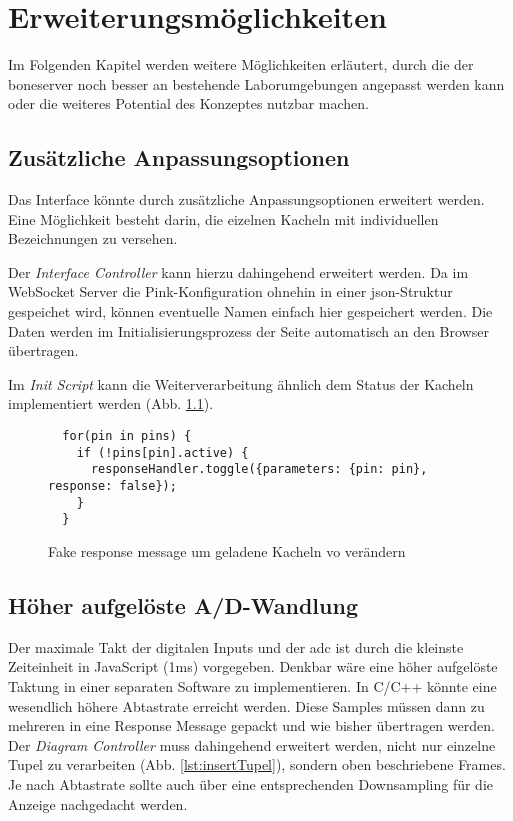 \chapter{Erweiterungsmöglichkeiten}
Im Folgenden Kapitel werden weitere Möglichkeiten erläutert, durch die der boneserver noch besser an bestehende Laborumgebungen angepasst werden kann oder die weiteres Potential des Konzeptes nutzbar machen.

\section{Zusätzliche Anpassungsoptionen}
Das Interface könnte durch zusätzliche Anpassungsoptionen erweitert werden. Eine Möglichkeit besteht darin, die eizelnen Kacheln mit individuellen Bezeichnungen zu versehen.

Der \textit{Interface Controller} kann hierzu dahingehend erweitert werden. Da im WebSocket Server die Pink-Konfiguration ohnehin in einer \gls{json}-Struktur gespeichet wird, können eventuelle Namen einfach hier gespeichert werden. Die Daten werden im Initialisierungsprozess der Seite automatisch an den Browser übertragen.

Im \textit{Init Script} kann die Weiterverarbeitung ähnlich dem Status der Kacheln implementiert werden (Abb. \ref{lst:fakeResponseMessage}).

\begin{figure}[H]
  \begin{lstlisting}
  for(pin in pins) {
    if (!pins[pin].active) {
      responseHandler.toggle({parameters: {pin: pin}, response: false});
    }
  }
  \end{lstlisting}
  \caption{Fake response message um geladene Kacheln vo verändern}
  \label{lst:fakeResponseMessage}
\end{figure}


\section{Höher aufgelöste A/D-Wandlung}
Der maximale Takt der digitalen Inputs und der \gls{adc} ist durch die kleinste Zeiteinheit in JavaScript (1ms) vorgegeben. Denkbar wäre eine höher aufgelöste Taktung in einer separaten Software zu implementieren. In C/C++ könnte eine wesendlich höhere Abtastrate erreicht werden. Diese Samples müssen dann zu mehreren in eine Response Message gepackt und wie bisher übertragen werden.\\

Der \textit{Diagram Controller} muss dahingehend erweitert werden, nicht nur einzelne Tupel zu verarbeiten (Abb. \ref{lst:insertTupel}), sondern oben beschriebene Frames. Je nach Abtastrate sollte auch über eine entsprechenden Downsampling für die Anzeige nachgedacht werden.


